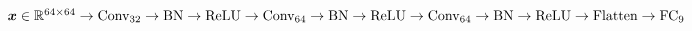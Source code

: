 $\vect{x} \in \real^{64 \times 64} \newline
	\rightarrow \text{Conv}_{32} \rightarrow \text{BN} \rightarrow \text{ReLU}  \newline
	\rightarrow \text{Conv}_{64} \rightarrow \text{BN} \rightarrow \text{ReLU}  \newline
	\rightarrow \text{Conv}_{64} \rightarrow \text{BN} \rightarrow \text{ReLU}  \newline
	\rightarrow \text{Flatten} \rightarrow \text{FC}_{9}
$